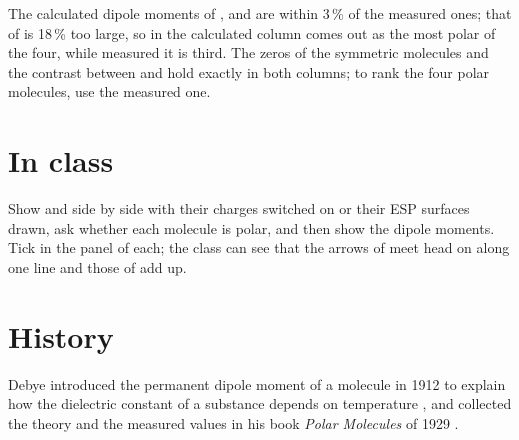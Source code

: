 The calculated dipole moments of ,  and  are within 3\,\% of the measured ones; that of  is 18\,\% too large, so in the calculated column  comes out as the most polar of the four, while measured it is third. The zeros of the symmetric molecules and the contrast between  and  hold exactly in both columns; to rank the four polar molecules, use the measured one.

\section{In class}
Show  and  side by side with their charges switched on or their ESP surfaces drawn, ask whether each molecule is polar, and then show the dipole moments. Tick  in the  panel of each; the class can see that the arrows of  meet head on along one line and those of  add up.

\section{History}
Debye introduced the permanent dipole moment of a molecule in 1912 to explain how the dielectric constant of a substance depends on temperature \cite{debye1912}, and collected the theory and the measured values in his book \emph{Polar Molecules} of 1929 \cite{debye1929}.
